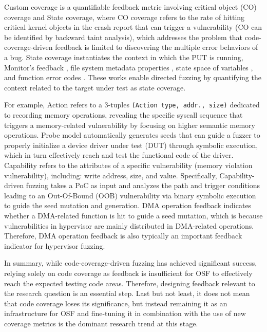 Custom coverage is a quantifiable feedback metric involving critical object (CO) coverage and State coverage, where CO coverage refers to the rate of hitting critical kernel objects in the crash report that can trigger a vulnerability (CO can be identified by backward taint analysis), which addresses the problem that code-coverage-driven feedback is limited to discovering the multiple error behaviors of a bug. State coverage instantiates the context in which the PUT is running, \eg Monitor's feedback \cite{Hydra2020finding}, file system metadata properties \cite{JANUS2019fuzzing}, state space of variables \cite{zhao2022statefuzz}, and function error codes \cite{zhao2022semantic}. These works enable directed fuzzing by quantifying the context related to the target under test as state coverage.

 For example, Action \cite{fleischer2023actor} refers to a 3-tuples \texttt{(Action type, addr., size)} dedicated to recording memory operations, revealing the specific syscall sequence that triggers a memory-related vulnerability by focusing on higher semantic memory operations. Probe model \cite{wu2023devfuzz} automatically generates seeds that can guide a fuzzer to properly initialize a device driver under test (DUT) through symbolic execution, which in turn effectively reach and test the functional code of the driver. Capability \cite{chen2020koobe} refers to the attributes of a specific vulnerability (\eg memory violation vulnerability), including: write address, size, and value. Specifically, Capability-driven fuzzing takes a PoC as input and analyzes the path and trigger conditions leading to an Out-Of-Bound (OOB) vulnerability via binary symbolic execution \cite{Chipounov2011S2EAP} to guide the seed mutation and generation. DMA operation feedback \cite{Liu2023VDGuard} indicates whether a DMA-related function is hit to guide a seed mutation, which is because vulnerabilities in hypervisor are mainly distributed in DMA-related operations. Therefore, DMA operation feedback is also typically an important feedback indicator for hypervisor fuzzing.

In summary, while code-coverage-driven fuzzing has achieved significant success, relying solely on code coverage as feedback is insufficient for OSF to effectively reach the expected testing code areas. Therefore, designing feedback relevant to the research question is an essential step. Last but not least, it does not mean that code coverage loses its significance, but instead remaining it as an infrastructure for OSF and fine-tuning it in combination with the use of new coverage metrics is the dominant research trend at this stage.

